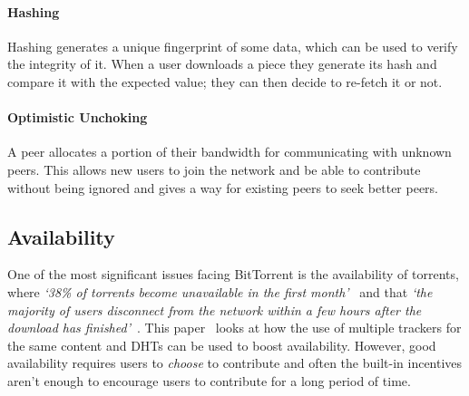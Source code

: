 \paragraph*{Hashing}
Hashing generates a unique fingerprint of some data, which can be used to verify the integrity of it. When a user downloads a piece they generate its hash and compare it with the expected value; they can then decide to re-fetch it or not. 

\paragraph*{Optimistic Unchoking}
A peer allocates a portion of their bandwidth for communicating with unknown peers. This allows new users to join the network and be able to contribute without being ignored and gives a way for existing peers to seek better peers.

\subsection*{Availability}\label{subsec:availability}

One of the most significant issues facing BitTorrent is the availability of torrents, where \textit{`38\% of torrents become unavailable in the first month'}~\cite{kaune_unraveling_2010} and that \textit{`the majority of users disconnect from the network within a few hours after the download has finished'}~\cite{pouwelse_bittorrent_2005}.
This paper~\cite{neglia_availability_2007} looks at how the use of multiple trackers for the same content and DHTs can be used to boost availability. 
However, good availability requires users to \textit{choose} to contribute and often the built-in incentives aren't enough to encourage users to contribute for a long period of time.
